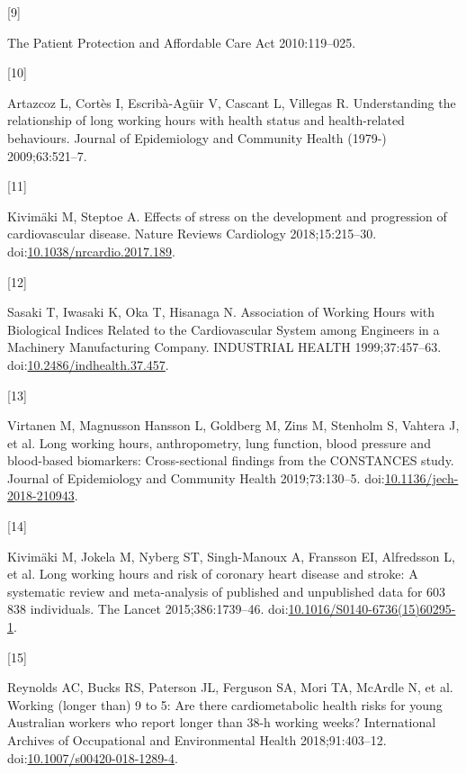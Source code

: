 \documentclass[]{elsarticle} %
\newlength{\cslhangindent}
\newlength{\csllabelwidth}
\newenvironment{CSLReferences}[2] %
 {%
  \setlength{\parindent}{0pt}
  \ifodd #1 \everypar{\setlength{\hangindent}{\cslhangindent}}\ignorespaces\fi
  \ifnum #2 > 0
  \setlength{\parskip}{#2\baselineskip}
  \fi
 }%
 {}
\newcommand{\CSLLeftMargin}[1]{\parbox[t]{\csllabelwidth}{#1}}
\newcommand{\CSLRightInline}[1]{\parbox[t]{\linewidth - \csllabelwidth}{#1}\break}
\begin{document}
\begin{CSLReferences}{0}{0}
\leavevmode{}%
\CSLLeftMargin{{[}9{]} }
\CSLRightInline{The {Patient Protection} and {Affordable Care Act}
2010:119--025.}

\leavevmode{}%
\CSLLeftMargin{{[}10{]} }
\CSLRightInline{Artazcoz L, Cortès I, Escribà-Agüir V, Cascant L,
Villegas R. Understanding the relationship of long working hours with
health status and health-related behaviours. Journal of Epidemiology and
Community Health (1979-) 2009;63:521--7.}

\leavevmode{}%
\CSLLeftMargin{{[}11{]} }
\CSLRightInline{Kivimäki M, Steptoe A. Effects of stress on the
development and progression of cardiovascular disease. Nature Reviews
Cardiology 2018;15:215--30.
doi:\href{https://doi.org/10.1038/nrcardio.2017.189}{10.1038/nrcardio.2017.189}.}

\leavevmode{}%
\CSLLeftMargin{{[}12{]} }
\CSLRightInline{Sasaki T, Iwasaki K, Oka T, Hisanaga N. Association of
{Working Hours} with {Biological Indices Related} to the {Cardiovascular
System} among {Engineers} in a {Machinery Manufacturing Company}.
INDUSTRIAL HEALTH 1999;37:457--63.
doi:\href{https://doi.org/10.2486/indhealth.37.457}{10.2486/indhealth.37.457}.}

\leavevmode{}%
\CSLLeftMargin{{[}13{]} }
\CSLRightInline{Virtanen M, Magnusson Hansson L, Goldberg M, Zins M,
Stenholm S, Vahtera J, et al. Long working hours, anthropometry, lung
function, blood pressure and blood-based biomarkers: Cross-sectional
findings from the {CONSTANCES} study. Journal of Epidemiology and
Community Health 2019;73:130--5.
doi:\href{https://doi.org/10.1136/jech-2018-210943}{10.1136/jech-2018-210943}.}

\leavevmode{}%
\CSLLeftMargin{{[}14{]} }
\CSLRightInline{Kivimäki M, Jokela M, Nyberg ST, Singh-Manoux A,
Fransson EI, Alfredsson L, et al. Long working hours and risk of
coronary heart disease and stroke: A systematic review and meta-analysis
of published and unpublished data for 603 838 individuals. The Lancet
2015;386:1739--46.
doi:\href{https://doi.org/10.1016/S0140-6736(15)60295-1}{10.1016/S0140-6736(15)60295-1}.}

\leavevmode{}%
\CSLLeftMargin{{[}15{]} }
\CSLRightInline{Reynolds AC, Bucks RS, Paterson JL, Ferguson SA, Mori
TA, McArdle N, et al. Working (longer than) 9 to 5: Are there
cardiometabolic health risks for young {Australian} workers who report
longer than 38-h working weeks? International Archives of Occupational
and Environmental Health 2018;91:403--12.
doi:\href{https://doi.org/10.1007/s00420-018-1289-4}{10.1007/s00420-018-1289-4}.}

\end{CSLReferences}
\end{document}

